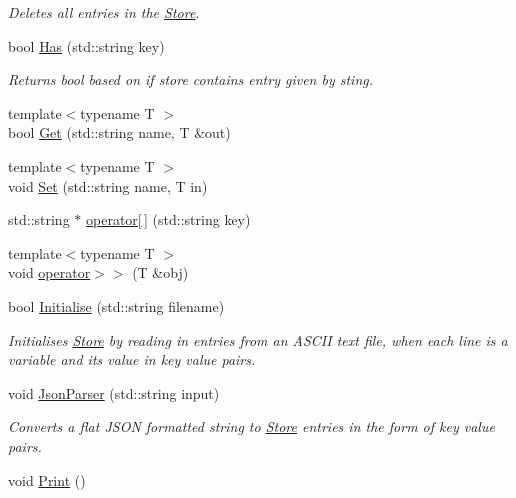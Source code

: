 \begin{DoxyCompactItemize}
\begin{DoxyCompactList}\small\item\em Deletes all entries in the \hyperlink{classStore}{Store}. \end{DoxyCompactList}\item 
bool \hyperlink{classStore_a41eaa81c4612fb5bdbf850afb6428977}{Has} (std\-::string key)
\begin{DoxyCompactList}\small\item\em Returns bool based on if store contains entry given by sting. \end{DoxyCompactList}\item 
{\footnotesize template$<$typename T $>$ }\\bool \hyperlink{classStore_abdc0134daa34b808328070f5d6b295f3}{Get} (std\-::string name, T \&out)
\item 
{\footnotesize template$<$typename T $>$ }\\void \hyperlink{classStore_af586739813ce18da6f5e3561d134a814}{Set} (std\-::string name, T in)
\item 
std\-::string $\ast$ \hyperlink{classStore_a790ca02bc7d11648edf0c8d5df3751fe}{operator\mbox{[}$\,$\mbox{]}} (std\-::string key)
\item 
{\footnotesize template$<$typename T $>$ }\\void \hyperlink{classStore_abe9b65d1308c43dc4158b00d6aed7385}{operator$>$$>$} (T \&obj)
\item 
bool \hyperlink{classStore_a5247080901fb214804d0191681a30a83}{Initialise} (std\-::string filename)
\begin{DoxyCompactList}\small\item\em Initialises \hyperlink{classStore}{Store} by reading in entries from an A\-S\-C\-I\-I text file, when each line is a variable and its value in key value pairs. \end{DoxyCompactList}\item 
void \hyperlink{classStore_adb84e3fb286cae07f64e8186b7ab04e1}{Json\-Parser} (std\-::string input)
\begin{DoxyCompactList}\small\item\em Converts a flat J\-S\-O\-N formatted string to \hyperlink{classStore}{Store} entries in the form of key value pairs. \end{DoxyCompactList}\item 
\hypertarget{classStore_a9d2f000bd849a9f5de71c3ba62dca340}{void \hyperlink{classStore_a9d2f000bd849a9f5de71c3ba62dca340}{Print} ()}\label{classStore_a9d2f000bd849a9f5de71c3ba62dca340}


\end{DoxyCompactItemize}
